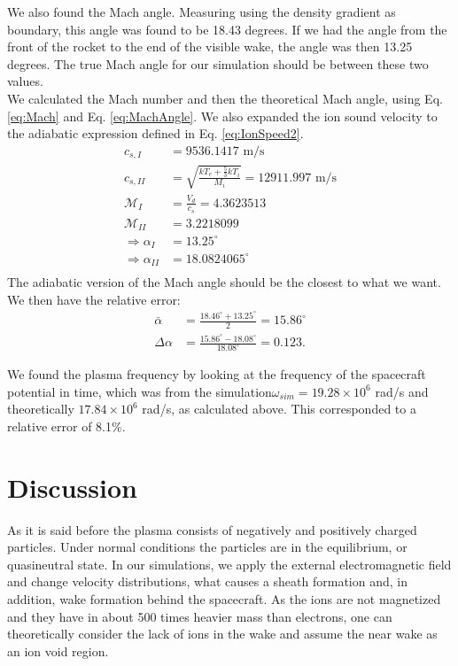 \documentclass[aip, 
rsi, 
amsmath,
amssymb,
longbibliography,
reprint]{revtex4-1}
\begin{document}
We also found the Mach angle. Measuring using the density gradient as boundary, this angle was found to be 18.43 degrees. If we had the angle from the front of the rocket to the end of the visible wake, the angle was then 13.25 degrees. The true Mach angle for our simulation should be between these two values.\\

We calculated the Mach number and then the theoretical Mach angle, using Eq. \ref{eq:Mach} and Eq. \ref{eq:MachAngle}. We also expanded the ion sound velocity to the adiabatic expression defined in Eq. \ref{eq:IonSpeed2}.
\begin{align*}
c_{s,I} &= 9536.1417 \, \, \text{m/s}\\
c_{s,II} &= \sqrt{\frac{kT_e + \frac{5}{3} k T_i}{ M_i}} = 12911.997 \, \, \text{m/s}\\
\mathcal{M}_{I} &= \frac{V_d}{c_s} = 4.3623513\\
\mathcal{M}_{II} &= 3.2218099\\
\Rightarrow \alpha_{I} &= 13.25 ^{\circ}\\
\Rightarrow \alpha_{II} &= 18.0824065 ^{\circ}\\
\end{align*}
The adiabatic version of the Mach angle should be the closest to what we want. We then have the relative error:
\begin{align*}
\bar{\alpha} &= \frac{18.46^{\circ} + 13.25^{\circ}}{2} = 15.86^{\circ}\\
\Delta \alpha &= \frac{15.86 ^{\circ}- 18.08^{\circ}}{18.08^{\circ}} = 0.123.
\end{align*}

We found the plasma frequency by looking at the frequency of the spacecraft potential in time, which was from the simulation$\omega_{sim} = 19.28\times10^{6}$ rad/s and theoretically $17.84\times 10^{6}$ rad/s, as calculated above. This corresponded to a relative error of 8.1\%.

\section{Discussion}

As it is said before the plasma consists of negatively and positively charged particles. Under normal conditions the particles are in the equilibrium, or quasineutral state. In our simulations, we apply the external electromagnetic field and change velocity distributions, what causes a sheath formation and, in addition, wake formation behind the spacecraft. As the ions are not magnetized and they have in about 500 times heavier mass than electrons, one can theoretically consider the lack of ions in the wake and assume the near wake as an ion void region.\\
\end{document}
